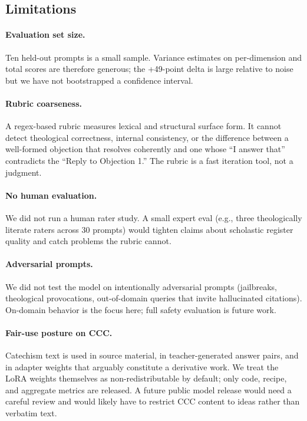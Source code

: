 \subsection{Limitations}
\label{sec:limitations}

\paragraph{Evaluation set size.} Ten held-out prompts is a small sample.
Variance estimates on per-dimension and total scores are therefore
generous; the +49-point delta is large relative to noise but we have
not bootstrapped a confidence interval.

\paragraph{Rubric coarseness.} A regex-based rubric measures lexical and
structural surface form. It cannot detect theological correctness,
internal consistency, or the difference between a well-formed objection
that resolves coherently and one whose ``I answer that'' contradicts the
``Reply to Objection 1.'' The rubric is a fast iteration tool, not a
judgment.

\paragraph{No human evaluation.} We did not run a human rater study. A
small expert eval (e.g., three theologically literate raters across 30
prompts) would tighten claims about scholastic register quality and
catch problems the rubric cannot.

\paragraph{Adversarial prompts.} We did not test the model on
intentionally adversarial prompts (jailbreaks, theological provocations,
out-of-domain queries that invite hallucinated citations). On-domain
behavior is the focus here; full safety evaluation is future work.

\paragraph{Fair-use posture on CCC.} Catechism text is used in source
material, in teacher-generated answer pairs, and in adapter weights
that arguably constitute a derivative work. We treat the LoRA weights
themselves as non-redistributable by default; only code, recipe, and
aggregate metrics are released. A future public model release would
need a careful review and would likely have to restrict CCC content to
ideas rather than verbatim text.
